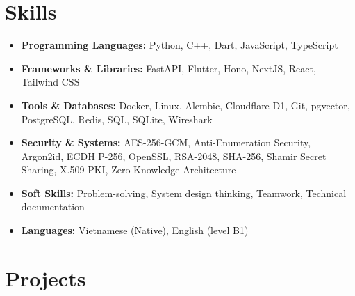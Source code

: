 \documentclass[10pt,a4paper]{article}
\begin{document}
\section*{Skills}
\begin{itemize}[leftmargin=0.15in, label={}, itemsep=0pt]
    \item \textbf{Programming Languages:} Python, C++, Dart, JavaScript, TypeScript
    \item \textbf{Frameworks \& Libraries:} FastAPI, Flutter, Hono, NextJS, React, Tailwind CSS
    \item \textbf{Tools \& Databases:} Docker, Linux, Alembic, Cloudflare D1, Git, pgvector, PostgreSQL, Redis, SQL, SQLite, Wireshark
    \item \textbf{Security \& Systems:} AES-256-GCM, Anti-Enumeration Security, Argon2id, ECDH P-256, OpenSSL, RSA-2048, SHA-256, Shamir Secret Sharing, X.509 PKI, Zero-Knowledge Architecture
    \item \textbf{Soft Skills:} Problem-solving, System design thinking, Teamwork, Technical documentation
    \item \textbf{Languages:} Vietnamese (Native), English (level B1)
\end{itemize}

\section*{Projects}
\end{document}
